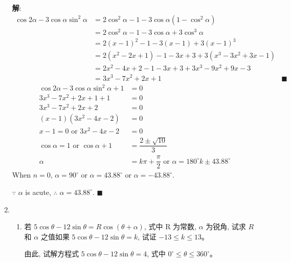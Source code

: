 \documentclass{report}
\newcommand{\sol}{\vspace{0.2cm}\textbf{解}:}
\begin{document}
\begin{enumerate}[leftmargin=*]
        \sol{}
        \begin{align*}
            \cos 2 \alpha-3 \cos \alpha \sin ^2 \alpha &= 2\cos^2\alpha - 1 - 3\cos\alpha(1 - \cos^2\alpha)\\
            & = 2\cos^2\alpha - 1 - 3\cos\alpha + 3\cos^3\alpha\\
            & = 2(x - 1)^2 - 1 - 3(x - 1) + 3(x - 1)^3\\
            & = 2(x^2 - 2x + 1) - 1 - 3x + 3 + 3(x^3 - 3x^2 + 3x - 1)\\
            & = 2x^2 - 4x + 2 - 1 - 3x + 3 + 3x^3 - 9x^2 + 9x - 3\\
            & = 3x^3 - 7x^2 + 2x + 1 & \blacksquare
        \end{align*}
        \begin{align*}
            \cos 2 \alpha-3 \cos \alpha \sin ^2 \alpha+1 &= 0\\
            3x^3 - 7x^2 + 2x + 1 + 1 &= 0\\
            3x^3 - 7x^2 + 2x + 2 &= 0\\
            (x - 1)(3x^2 - 4x - 2) &= 0\\
            x - 1 = 0 \text{ or } 3x^2 - 4x - 2 &= 0\\
            \cos \alpha = 1 \text{ or } \cos \alpha + 1 &= \dfrac{2 \pm \sqrt{10}}{3}\\
            \alpha &= k\pi + \dfrac{\pi}{2} \text{ or } \alpha = 180^{\circ}k \pm 43.88^{\circ}
        \end{align*}
        When $n = 0$, $\alpha = 90^{\circ}$ or $\alpha = 43.88^{\circ}$ or $\alpha = -43.88^{\circ}$.

        $\because$ $\alpha$ is acute, $\therefore$ $\alpha = 43.88^{\circ}$. \hfill $\blacksquare$
        
        \item \begin{enumerate}
    
            \item 若 $5 \cos \theta-12 \sin \theta=R \cos (\theta+\alpha)$, 式中 $\mathrm{R}$ 为常数, $\alpha$ 为锐角, 试求 $R$ 和 $\alpha$ 之值如果 $5 \cos \theta-12 \sin \theta=k$, 试证 $-13 \leq k \leq 13$。
        
            由此, 试解方程式 $5 \cos \theta-12 \sin \theta=4$, 式中 $0^{\circ} \leq \theta \leq 360^{\circ}$。


\end{enumerate}
\end{enumerate}
\end{document}
